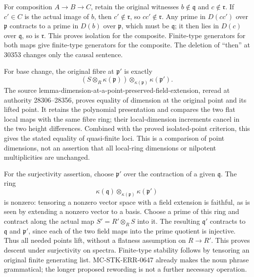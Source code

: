For composition \(A\to B\to C\), retain the original witnesses \(b\notin\mathfrak q\) and \(c\notin\mathfrak r\). If \(c'\in C\) is the actual image of \(b\), then \(c'\notin\mathfrak r\), so \(cc'\notin\mathfrak r\). Any prime in \(D(cc')\) over \(\mathfrak p\) contracts to a prime in \(D(b)\) over \(\mathfrak p\), which must be \(\mathfrak q\); it then lies in \(D(c)\) over \(\mathfrak q\), so is \(\mathfrak r\). This proves isolation for the composite. Finite-type generators for both maps give finite-type generators for the composite. The deletion of ``then'' at 30353 changes only the causal sentence.

For base change, the original fibre at \(\mathfrak p'\) is exactly \[
 (S\otimes_R\kappa(\mathfrak p))
       \otimes_{\kappa(\mathfrak p)}\kappa(\mathfrak p').
\] The source lemma-\AlgebraIdentifierBreak{}dimension-\AlgebraIdentifierBreak{}at-\AlgebraIdentifierBreak{}a-\AlgebraIdentifierBreak{}point-\AlgebraIdentifierBreak{}preserved-\AlgebraIdentifierBreak{}field-\AlgebraIdentifierBreak{}extension, reread at authority 28306--28356, proves equality of dimension at the original point and its lifted point. It retains the polynomial presentation and compares the two flat local maps with the same fibre ring; their local-dimension increments cancel in the two height differences. Combined with the proved isolated-point criterion, this gives the stated equality of quasi-finite loci. This is a comparison of point dimensions, not an assertion that all local-ring dimensions or nilpotent multiplicities are unchanged.

For the surjectivity assertion, choose \(\mathfrak p'\) over the contraction of a given \(\mathfrak q\). The ring \[
 \kappa(\mathfrak q)\otimes_{\kappa(\mathfrak p)}
       \kappa(\mathfrak p')
\] is nonzero: tensoring a nonzero vector space with a field extension is faithful, as is seen by extending a nonzero vector to a basis. Choose a prime of this ring and contract along the actual map \(S'=R'\otimes_RS\) into it. The resulting \(\mathfrak q'\) contracts to \(\mathfrak q\) and \(\mathfrak p'\), since each of the two field maps into the prime quotient is injective. Thus all needed points lift, without a flatness assumption on \(R\to R'\). This proves descent under surjectivity on spectra. Finite-type stability follows by tensoring an original finite generating list. MC-\AlgebraIdentifierBreak{}STK-\AlgebraIdentifierBreak{}ERR-\AlgebraIdentifierBreak{}0647 already makes the noun phrase grammatical; the longer proposed rewording is not a further necessary operation.

